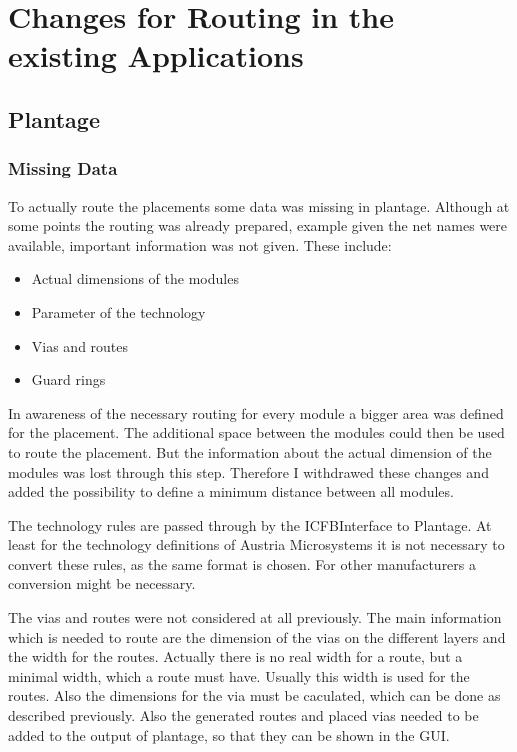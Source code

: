 \section{Changes for Routing in the existing Applications}

\subsection{Plantage}

\subsubsection{Missing Data}
To actually route the placements some data was missing in plantage. Although at some points the routing was already prepared, example given the net names were available, important information was not given. These include:
\begin{itemize}
\item Actual dimensions of the modules
\item Parameter of the technology
\item Vias and routes
\item Guard rings
\end{itemize}

In awareness of the necessary routing for every module a bigger area was defined for the placement. The additional space between the modules could then be used to route the placement. But the information about the actual dimension of the modules was lost through this step. Therefore I withdrawed these changes and added the possibility to define a minimum distance between all modules.

The technology rules are passed through by the ICFBInterface to Plantage. At least for the technology definitions of Austria Microsystems it is not necessary to convert these rules, as the same format is chosen. For other manufacturers a conversion might be necessary.

The vias and routes were not considered at all previously. The main information which is needed to route are the dimension of the vias on the different layers and the width for the routes. Actually there is no real width for a route, but a minimal width, which a route must have. Usually this width is used for the routes. Also the dimensions for the via must be caculated, which can be done as described previously. Also the generated routes and placed vias needed to be added to the output of plantage, so that they can be shown in the GUI.

